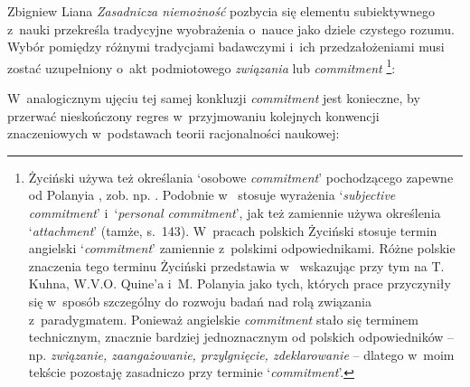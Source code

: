 \begin{artplenv}{Zbigniew Liana}
\textit{Zasadnicza niemożność} pozbycia się elementu subiektywnego z~nauki przekreśla tradycyjne wyobrażenia o~nauce jako dziele czystego rozumu. Wybór pomiędzy różnymi tradycjami badawczymi i~ich przedzałożeniami musi zostać uzupełniony o~akt podmiotowego \textit{związania} lub \textit{commitment}
\parencites[][s.~160]{zycinski_teizm_1985}[][s.~186n.191]{zycinski_elementy_1996}[][s.~253n.258]{zycinski_elementy_2015}%
\footnote{Życiński używa też określania ‘osobowe \textit{commitment}' pochodzącego zapewne od Polanyia 
\parencite*[][]{polanyi_personal_1962}, %
 zob. np. 
\parencite[][s.~79.125.165]{zycinski_teizm_1985}. %
 Podobnie w~
\parencite[][s.~137.144]{zycinski_structure_1988} %
 stosuje wyrażenia ‘\textit{subjective commitment}' i~‘\textit{personal commitment}', jak też zamiennie używa określenia ‘\textit{attachment}' (tamże, s.~143). W~pracach polskich Życiński stosuje termin angielski ‘\textit{commitment}' zamiennie z~polskimi odpowiednikami. Różne polskie znaczenia tego terminu Życiński przedstawia w~
\parencites[][s.~191]{zycinski_elementy_1996}[][s.~259n]{zycinski_elementy_2015} %
 wskazując przy tym na T. Kuhna, W.V.O. Quine'a i~M. Polanyia jako tych, których prace przyczyniły się w~sposób szczególny do rozwoju badań nad rolą związania z~paradygmatem. Ponieważ angielskie \textit{commitment} stało się terminem technicznym, znacznie bardziej jednoznacznym od polskich odpowiedników -- np. \textit{związanie, zaangażowanie, przylgnięcie, zdeklarowanie} -- dlatego w~moim tekście pozostaję zasadniczo przy terminie ‘\textit{commitment}'.}:



W~analogicznym ujęciu tej samej konkluzji \textit{commitment} jest konieczne, by przerwać nieskończony regres w~przyjmowaniu kolejnych konwencji znaczeniowych w~podstawach teorii racjonalności naukowej:


\end{artplenv}
